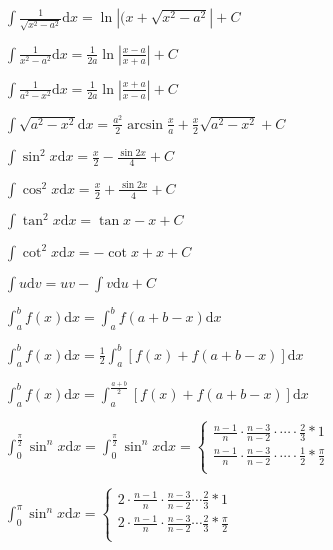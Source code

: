 \noindent $\int{\frac{1}{\sqrt{x^2 - a^2}}}\mathrm{d}x = \ln{\left|(x + \sqrt{x^2 - a ^2}\right|} + C$

\begin{multicols}{2}
    \begin{spacing}{\hangju}
        \noindent $\int{\frac{1}{x^2 - a^2}} \mathrm{d}x = \frac{1}{2a} \ln{\left| \frac{x - a}{x + a} \right|} + C$

        \noindent $\int{\frac{1}{a^2 - x^2}} \mathrm{d}x = \frac{1}{2a} \ln{\left| \frac{x + a}{x - a} \right|} + C$
    \end{spacing}
\end{multicols}

\noindent $\int{\sqrt{a^2 - x^2}}\mathrm{d}x = \frac{a^2}{2}\arcsin{\frac{x}{a}} + \frac{x}{2}\sqrt{a^2 - x^2} + C$

\begin{multicols}{2}
    \begin{spacing}{\hangju}
        \LARGE
        \noindent $\int{\sin^2{x}}\mathrm{d}x = \frac{x}{2} - \frac{\sin{2x}}{4} + C$

        \noindent $\int{\cos^2{x}}\mathrm{d}x = \frac{x}{2} + \frac{\sin{2x}}{4} + C$

        \noindent $\int{\tan^2{x}}\mathrm{d}x = \tan{x} - x + C$

        \noindent $\int{\cot^2{x}}\mathrm{d}x = - \cot{x} + x + C$

        \noindent $\int{u}\mathrm{d}v = uv - \int{v}\mathrm{d}u + C$

        \noindent $\int_{a}^{b}{f(x)}\mathrm{d}x = \int_{a}^{b}{f(a + b - x)}\mathrm{d}x$
    \end{spacing}
\end{multicols}
\noindent $\int_{a}^{b}{f(x)}\mathrm{d}x = \frac{1}{2}\int_{a}^{b}{[f(x) + f(a + b - x)]}\mathrm{d}x$

\noindent $\int_{a}^{b}{f(x)}\mathrm{d}x = \int_{a}^{\frac{a+b}{2}}{[f(x) + f(a + b - x)]}\mathrm{d}x$

\noindent $\int_{0}^{\frac{\pi}{2}}{\sin^n{x}}\mathrm{d}x = \int_{0}^{\frac{\pi}{2}}{\sin^n{x}}\mathrm{d}x = \begin{cases}
    \frac{n - 1}{n} \cdot \frac{n - 3}{n - 2} \cdot \cdots  \cdot \frac{2}{3} * 1 \\
    \frac{n - 1}{n} \cdot \frac{n - 3}{n - 2} \cdot \cdots  \cdot \frac{1}{2} * \frac{\pi}{2} \\
\end{cases}$

\noindent $\int_{0}^{\pi}{\sin^n{x}}\mathrm{d}x = \begin{cases}
    2 \cdot \frac{n - 1}{n} \cdot \frac{n - 3}{n - 2} \cdots \frac{2}{3} * 1 \\
    2 \cdot \frac{n - 1}{n} \cdot \frac{n - 3}{n - 2} \cdots \frac{2}{3} * \frac{\pi}{2} \\
\end{cases}$

